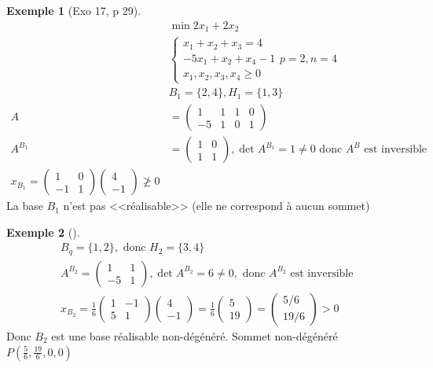 \documentclass{article}
\theoremstyle{plain}%
\theoremstyle{definition}
\newtheorem{exmp}{Exemple}[section]
\theoremstyle{remark}
\begin{document}
\begin{exmp}[Exo 17, p 29]
    \begin{align*}
        & \min 2x_1 + 2x_2 \\
        &\begin{cases}
            x_1 + x_2 + x_3 = 4 \\
            -5 x_1 + x_2 + x_4 -1 \\
            x_1 , x_2 , x_3 , x_4 \geq 0
        \end{cases} p=2 , n=4 \\
        &B_1 = \{2,4\}, H_1 = \{1,3\} \\
        A &= \begin{pmatrix}
            1 & 1 & 1 & 0 \\
            -5 & 1 & 0 & 1
        \end{pmatrix} \\ 
        A^{B_1} &= \begin{pmatrix}1 & 0 \\ 1 & 1\end{pmatrix}, \det A^{B_1} = 1 \neq 0 \text{ donc } A^B \text{ est inversible} \\
        x_{B_1} = \begin{pmatrix}1 & 0 \\ -1 & 1\end{pmatrix} \begin{pmatrix}4 \\ -1\end{pmatrix} \not\geq 0
    \end{align*}
    La base $ B_{1} $ n'est pas <<réalisable>> (elle ne correspond à aucun sommet)
\end{exmp}
\begin{exmp}[]
    \begin{align*}
        &B_q = \{1,2\}, \text{ donc } H_2 = \{3,4\} \\
        & A^{B_2} = \begin{pmatrix}1 & 1 \\ -5 & 1 \end{pmatrix}, \det A^{B_2} = 6 \neq 0, \text{ donc } A^{B_2} \text{ est inversible } \\
        & x_{B_2} = \frac{1}{6} \begin{pmatrix}1 & -1 \\ 5 & 1\end{pmatrix} \begin{pmatrix}4 \\ -1\end{pmatrix} = \frac{1}{6} \begin{pmatrix}5\\19\end{pmatrix} = \begin{pmatrix}5/6 \\ 19/6\end{pmatrix} > 0
    \end{align*}
    Donc $ B_2 $ est une base réalisable non-dégénéré. Sommet non-dégénéré $ P(\frac{5}{6}, \frac{19}{6}, 0,0) $ 
\end{exmp}
\end{document}
